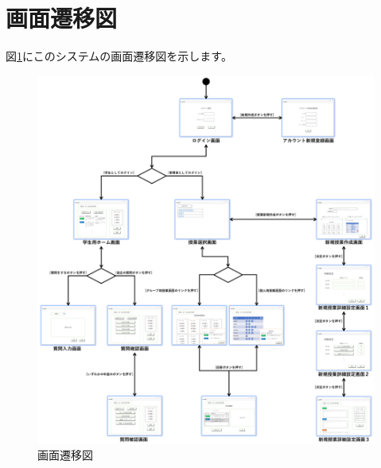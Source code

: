 \section{画面遷移図}
図\ref{fig:sc_transition}にこのシステムの画面遷移図を示します。

\begin{figure}[htbp]
  \begin{center}
    \includegraphics[width=1\linewidth,clip]{./img/sc_transition.png}
    \caption{画面遷移図}\label{fig:sc_transition}
  \end{center}
\end{figure}
